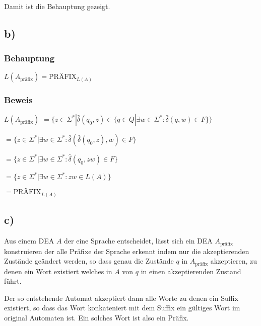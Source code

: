 	\paragraph*{}
	Damit ist die Behauptung gezeigt.
	  
	  \newpage
\subsection*{b)}

\subsubsection*{Behauptung}
$L(A_{\text{präfix}}) = \text{PRÄFIX}_{L(A)}$

\subsubsection*{Beweis}

$L(A_{\text{präfix}})$
$ = \{z \in \Sigma^* | \hat{\delta}(q_0,z) \in \{q \in Q| \exists w \in \Sigma^* : \hat{\delta}(q,w)\in F\}\}$

$ = \{z \in \Sigma^* | \exists w \in \Sigma^* : \hat{\delta}(\hat{\delta}(q_0,z),w)\in F\}$


$ = \{z \in \Sigma^* | \exists w \in \Sigma^* : \hat{\delta}(q_0,zw)\in F\}$


$ = \{z \in \Sigma^* | \exists w \in \Sigma^* : zw \in L(A)\}$

$ = \text{PRÄFIX}_{L(A)}$


\subsection*{c)}

Aus einem DEA $A$ der eine Sprache entscheidet, lässt sich ein DEA $A_{\text{präfix}}$ konstruieren der alle Präfixe der Sprache erkennt indem nur die akzeptierenden Zustände geändert werden,
so dass genau die Zustände $q$ in $A_{\text{präfix}}$ akzeptieren, zu denen ein Wort existiert welches in $A$ von $q$ in einen akzeptierenden Zustand führt.

Der so entstehende Automat akzeptiert dann alle Worte zu denen ein Suffix existiert, so dass das Wort konkateniert mit dem Suffix ein gültiges Wort im original Automaten ist.
Ein solches Wort ist also ein Präfix.
